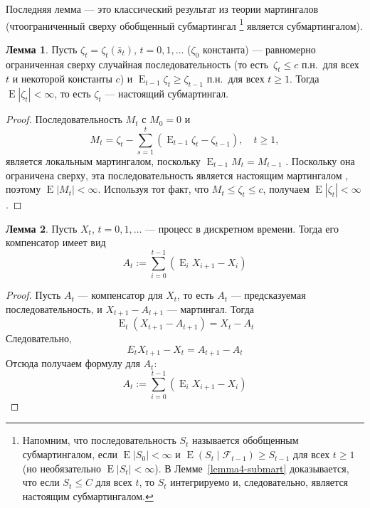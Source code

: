 \documentclass[a4paper,12pt,russian]{article} %
\theoremstyle{definition}
\newtheorem{lemma}{Лемма}
\DeclareMathOperator{\E}{E}
\newcommand{\F}{\mathcal{F}}
\begin{document}
Последняя лемма — это классический результат из теории мартингалов (чтоограниченный сверху обобщенный субмартингал 
\footnote{Напомним, что последовательность $S_t$ называется обобщенным субмартингалом, если $\E |S_0|<\infty$ и $\E(S_t\mid\F_{t-1})\ge S_{t-1}$ для всех $t\ge 1$ (но необязательно $\E|S_t|<\infty$). В Лемме~\eqref{lemma4-submart} доказывается, что если $S_t\le C$ для всех $t$, то $S_t$ интегрируемо и, следовательно, является настоящим субмартингалом.} является субмартингалом).


\begin{lemma}
\label{lemma4-submart}
Пусть $\zeta_t=\zeta_t(\bar s_t)$, $t=0,1,\dots$ ($\zeta_0$ константа)  — равномерно ограниченная сверху случайная последовательность (то есть\ $\zeta_t\le c$ п.н.\ для всех $t$ и некоторой константы $c$) и $\E_{t-1} \zeta_t\ge \zeta_{t-1}$ п.н.\ для всех $t\ge 1$.
Тогда $\E|\zeta_t| < \infty$, то есть $\zeta_t$ — настоящий субмартингал.
\end{lemma}
\begin{proof}
Последовательность $M_t$ с $M_0=0$ и
\[
M_t = \zeta_t - \sum_{s=1}^t (\E_{t-1} \zeta_t - \zeta_{t-1}),\quad
t \ge 1,
\]
является локальным мартингалом, поскольку $\E_{t-1} M_t = M_{t-1}$ \cite[Гл.~7.1, Т.~1]{Shiryaev2019}.
Поскольку она ограничена сверху, эта последовательность является настоящим мартингалом  \cite[Гл.~7.1, Т.~3]{Shiryaev2019}, поэтому $\E |M_t| < \infty$.
Используя тот факт, что $M_t \le \zeta_t \le c$, получаем $\E|\zeta_t| < \infty$. 
\end{proof}

\begin{lemma}
\label{lemma5-compensator}
Пусть $X_t$, $t=0,1,\dots$ — процесс в дискретном времени. Тогда его компенсатор имеет вид
\[
A_t := \sum_{i=0}^{t-1} (\E_{i} X_{i+1} - X_i)
\]
\end{lemma}

\begin{proof}
Пусть $A_{t}$ — компенсатор для $X_t$, то есть $A_t$ — предсказуемая последовательность, и $X_{t+1} - A_{t+1}$ — мартингал.
Тогда 
\[
\E_{t} \left(  X_{t+1} - A_{t+1} \right) = X_t - A_t
\]
Следовательно, 
\[
E_{t} X_{t+1}  -X_t = A_{t+1} - A_t
\]
Отсюда получаем формулу для $A_t$:
\[
A_t := \sum_{i=0}^{t-1} (\E_{i} X_{i+1} - X_i)
\]


\end{proof}
\end{document}
